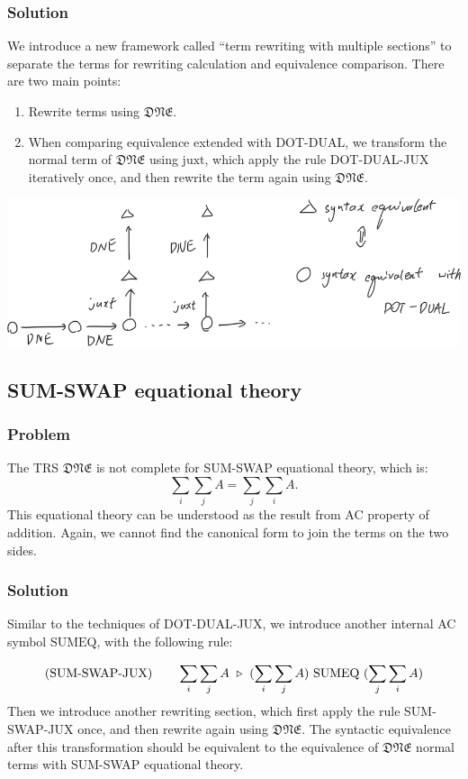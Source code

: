 \subsubsection*{Solution}
We introduce a new framework called ``term rewriting with multiple sections'' to separate the terms for rewriting calculation and equivalence comparison. There are two main points:
\begin{enumerate}
    \item Rewrite terms using $\mathfrak{DNE}$.
    \item When comparing equivalence extended with \textsf{DOT-DUAL}, we transform the normal term of $\mathfrak{DNE}$ using $\textrm{juxt}$, which apply the rule DOT-DUAL-JUX iteratively once, and then rewrite the term again using $\mathfrak{DNE}$.
\end{enumerate}

\begin{center}
    \includegraphics*[width=.8\textwidth]{fig/DNE-JUX.png}
\end{center}

\subsection{\textsf{SUM-SWAP} equational theory}
\subsubsection*{Problem}
The TRS $\mathfrak{DNE}$ is not complete for \textsf{SUM-SWAP} equational theory, which is:
$$
\sum_i \sum_j A = \sum_j \sum_i A.
$$
This equational theory can be understood as the result from AC property of addition. Again, we cannot find the canonical form to join the terms on the two sides.

\subsubsection*{Solution}
Similar to the techniques of DOT-DUAL-JUX, we introduce another internal AC symbol $\textrm{SUMEQ}$, with the following rule:

$$
\textrm{(SUM-SWAP-JUX)} \qquad \sum_i \sum_j A \ \triangleright\  (\sum_i \sum_j A)\ \textrm{SUMEQ}\ (\sum_j \sum_i A)
$$
Then we introduce another rewriting section, which first apply the rule SUM-SWAP-JUX once, and then rewrite again using $\mathfrak{DNE}$. The syntactic equivalence after this transformation should be equivalent to the equivalence of $\mathfrak{DNE}$ normal terms with \textsf{SUM-SWAP} equational theory.

